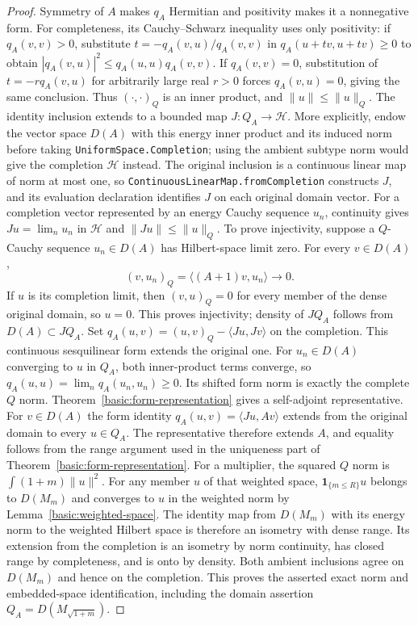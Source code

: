 \documentclass[11pt,a4paper]{article}
\theoremstyle{definition}
\theoremstyle{remark}
\begin{document}
\begin{proof}
Symmetry of $A$ makes $q_A$ Hermitian and positivity makes it a
nonnegative form. For completeness, its Cauchy--Schwarz inequality
uses only positivity: if $q_A(v,v)>0$, substitute
$t=-q_A(v,u)/q_A(v,v)$ in $q_A(u+tv,u+tv)\geq0$ to obtain
$|q_A(v,u)|^2\leq q_A(u,u)q_A(v,v)$. If $q_A(v,v)=0$,
substitution of $t=-r q_A(v,u)$ for arbitrarily large real $r>0$
forces $q_A(v,u)=0$, giving the same conclusion.
Thus $(\cdot,\cdot)_Q$ is an inner product, and
$\|u\|\leq\|u\|_Q$. The identity inclusion extends to a bounded map
$J:Q_A\to\mathcal H$. More explicitly, endow the vector space
$D(A)$ with this energy inner product and its induced norm before
taking \nolinkurl{UniformSpace.Completion}; using the ambient
subtype norm would give the completion $\mathcal H$ instead.
The original inclusion is a continuous linear map of norm at most
one, so \nolinkurl{ContinuousLinearMap.fromCompletion} constructs
$J$, and its evaluation declaration identifies $J$ on each original
domain vector. For a completion vector represented by an energy
Cauchy sequence $u_n$, continuity gives $Ju=\lim_nu_n$ in
$\mathcal H$ and $\|Ju\|\leq\|u\|_Q$.
To prove injectivity, suppose a $Q$-Cauchy
sequence $u_n\in D(A)$ has Hilbert-space limit zero. For every
$v\in D(A)$,
\[
 (v,u_n)_Q=\langle (A+1)v,u_n\rangle\longrightarrow0.
\]
If $u$ is its completion limit, then $(v,u)_Q=0$ for every member
of the dense original domain, so $u=0$. This proves injectivity;
density of $JQ_A$ follows from $D(A)\subset JQ_A$.
Set $q_A(u,v)=(u,v)_Q-\langle Ju,Jv\rangle$ on the completion.
This continuous sesquilinear form extends the original one.
For $u_n\in D(A)$ converging to $u$ in $Q_A$, both inner-product
terms converge, so $q_A(u,u)=\lim_n q_A(u_n,u_n)\geq0$.
Its shifted
form norm is exactly the complete $Q$ norm. Theorem~\ref{basic:form-representation}
gives a self-adjoint representative. For $v\in D(A)$ the form
identity $q_A(u,v)=\langle Ju,Av\rangle$ extends from the original
domain to every $u\in Q_A$. The representative therefore extends
$A$, and equality follows from the range argument used in the
uniqueness part of Theorem~\ref{basic:form-representation}.
For a multiplier, the squared $Q$ norm is
$\int(1+m)\|u\|^2$. For any member $u$ of that weighted space,
$\mathbf1_{\{m\leq R\}}u$ belongs to $D(M_m)$ and converges
to $u$ in the weighted norm by
Lemma~\ref{basic:weighted-space}. The identity map from $D(M_m)$
with its energy norm to the weighted Hilbert space is therefore
an isometry with dense range. Its extension from the completion is
an isometry by norm continuity, has closed range by completeness,
and is onto by density. Both ambient inclusions agree on $D(M_m)$
and hence on the completion. This proves the asserted exact norm
and embedded-space identification, including the domain assertion
$Q_A=D(M_{\sqrt{1+m}})$.
\end{proof}
\end{document}
